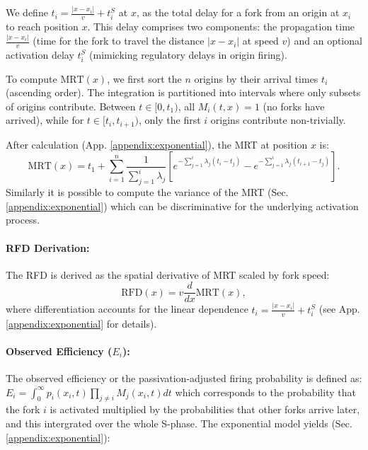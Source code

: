 \documentclass[10pt,a4paper]{revtex4-2}
\begin{document}
We define \(t_i = \frac{|x - x_i|}{v} + t_i^S\) at $x$, as the total delay for a fork from an origin at \(x_i\) to reach position \(x\). This delay comprises two components: the propagation time \(\frac{|x - x_i|}{v}\) (time for the fork to travel the distance \(|x - x_i|\) at speed \(v\)) and an optional activation delay \(t_i^S\) (mimicking regulatory delays in origin firing).

To compute \(\text{MRT}(x)\), we first sort the \(n\) origins by their arrival times \(t_i\) (ascending order). The integration is partitioned into intervals where only subsets of origins contribute. Between \(t \in [0, t_1)\), all \(M_i(t,x) = 1\) (no forks have arrived), while for \(t \in [t_i, t_{i+1})\), only the first \(i\) origins contribute non-trivially.

After calculation (App. \ref{appendix:exponential}), the MRT at position \(x\) is:
\begin{equation}\label{eq:mrt_exp}
\text{MRT}(x) = t_1 + \sum_{i=1}^{n}\frac{1}{\sum_{j=1}^i \lambda_j}\left[e^{-\sum_{j=1}^i \lambda_j(t_i - t_j)} - e^{-\sum_{j=1}^i \lambda_j(t_{i+1} - t_j)}\right].
\end{equation}
Similarly it is possible to compute the variance of the MRT (Sec. \ref{appendix:exponential}) which can be discriminative for the underlying activation process.

\paragraph{RFD Derivation:}
The RFD is derived as the spatial derivative of MRT scaled by fork speed:
\begin{equation}\label{eq:rfd_exp}
\text{RFD}(x) = v \frac{d}{dx}\text{MRT}(x),
\end{equation}
where differentiation accounts for the linear dependence \(t_i = \frac{|x - x_i|}{v} + t_i^S\) (see App. \ref{appendix:exponential} for details).

\paragraph{Observed Efficiency (\(E_i\)):} 
The observed efficiency or the passivation-adjusted firing probability is defined as:
$E_i = \int_0^{\infty} p_i(x_i,t)\prod_{j \neq i} M_j(x_i,t)dt$ which corresponds to the probability that 
the fork $i$ is activated multiplied by the probabilities that other forks arrive later,
and this intergrated over the whole S-phase.
The exponential model yields (Sec. \ref{appendix:exponential}):
\end{document}
